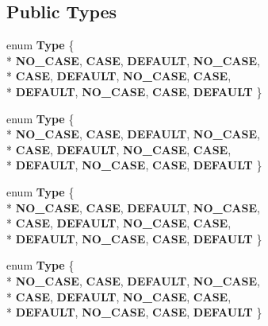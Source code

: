 \subsection*{Public Types}
\begin{DoxyCompactItemize}
\item 
enum {\bfseries Type} \{ \\*
{\bfseries N\-O\-\_\-\-C\-A\-S\-E}, 
{\bfseries C\-A\-S\-E}, 
{\bfseries D\-E\-F\-A\-U\-L\-T}, 
{\bfseries N\-O\-\_\-\-C\-A\-S\-E}, 
\\*
{\bfseries C\-A\-S\-E}, 
{\bfseries D\-E\-F\-A\-U\-L\-T}, 
{\bfseries N\-O\-\_\-\-C\-A\-S\-E}, 
{\bfseries C\-A\-S\-E}, 
\\*
{\bfseries D\-E\-F\-A\-U\-L\-T}, 
{\bfseries N\-O\-\_\-\-C\-A\-S\-E}, 
{\bfseries C\-A\-S\-E}, 
{\bfseries D\-E\-F\-A\-U\-L\-T}
 \}
\item 
enum {\bfseries Type} \{ \\*
{\bfseries N\-O\-\_\-\-C\-A\-S\-E}, 
{\bfseries C\-A\-S\-E}, 
{\bfseries D\-E\-F\-A\-U\-L\-T}, 
{\bfseries N\-O\-\_\-\-C\-A\-S\-E}, 
\\*
{\bfseries C\-A\-S\-E}, 
{\bfseries D\-E\-F\-A\-U\-L\-T}, 
{\bfseries N\-O\-\_\-\-C\-A\-S\-E}, 
{\bfseries C\-A\-S\-E}, 
\\*
{\bfseries D\-E\-F\-A\-U\-L\-T}, 
{\bfseries N\-O\-\_\-\-C\-A\-S\-E}, 
{\bfseries C\-A\-S\-E}, 
{\bfseries D\-E\-F\-A\-U\-L\-T}
 \}
\item 
enum {\bfseries Type} \{ \\*
{\bfseries N\-O\-\_\-\-C\-A\-S\-E}, 
{\bfseries C\-A\-S\-E}, 
{\bfseries D\-E\-F\-A\-U\-L\-T}, 
{\bfseries N\-O\-\_\-\-C\-A\-S\-E}, 
\\*
{\bfseries C\-A\-S\-E}, 
{\bfseries D\-E\-F\-A\-U\-L\-T}, 
{\bfseries N\-O\-\_\-\-C\-A\-S\-E}, 
{\bfseries C\-A\-S\-E}, 
\\*
{\bfseries D\-E\-F\-A\-U\-L\-T}, 
{\bfseries N\-O\-\_\-\-C\-A\-S\-E}, 
{\bfseries C\-A\-S\-E}, 
{\bfseries D\-E\-F\-A\-U\-L\-T}
 \}
\item 
enum {\bfseries Type} \{ \\*
{\bfseries N\-O\-\_\-\-C\-A\-S\-E}, 
{\bfseries C\-A\-S\-E}, 
{\bfseries D\-E\-F\-A\-U\-L\-T}, 
{\bfseries N\-O\-\_\-\-C\-A\-S\-E}, 
\\*
{\bfseries C\-A\-S\-E}, 
{\bfseries D\-E\-F\-A\-U\-L\-T}, 
{\bfseries N\-O\-\_\-\-C\-A\-S\-E}, 
{\bfseries C\-A\-S\-E}, 
\\*
{\bfseries D\-E\-F\-A\-U\-L\-T}, 
{\bfseries N\-O\-\_\-\-C\-A\-S\-E}, 
{\bfseries C\-A\-S\-E}, 
{\bfseries D\-E\-F\-A\-U\-L\-T}
 \}
\end{DoxyCompactItemize}

